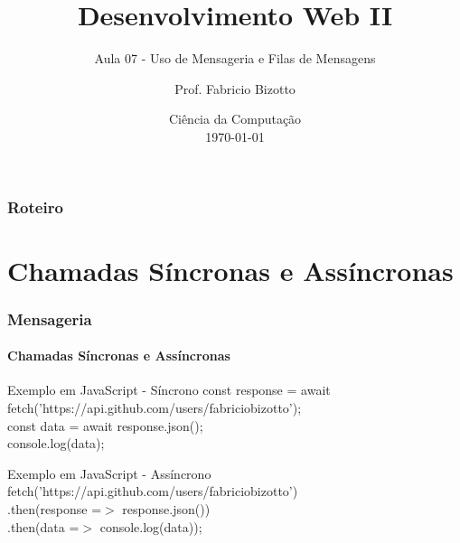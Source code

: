 \documentclass[
	9pt, %
	t, %
]{beamer}
\title[DesWebII]{Desenvolvimento Web II} %
\subtitle{Aula 07 - Uso de Mensageria e Filas de Mensagens} %
\author[Fabricio Bizotto]{Prof. Fabricio Bizotto} %
\institute[IFC]{Instituto Federal Catarinense \\ \smallskip \textit{fabricio.bizotto@ifc.edu.br}} %
\date[\today]{Ciência da Computação \\ \today} %
\begin{document}

\begin{frame}
	\titlepage %
\end{frame}


\begin{frame}
	\frametitle{Roteiro} %
	
	\tableofcontents %
\end{frame}


\section{Chamadas Síncronas e Assíncronas}

\begin{frame}
	\frametitle{Mensageria}
	\framesubtitle{Chamadas Síncronas e Assíncronas}

	\begin{exampleblock}{Exemplo em JavaScript - Síncrono}
		const response = await fetch('https://api.github.com/users/fabriciobizotto');\\
		const data = await response.json();\\
		console.log(data);\\
	\end{exampleblock}

	\begin{exampleblock}{Exemplo em JavaScript - Assíncrono}
		fetch('https://api.github.com/users/fabriciobizotto')\\
			.then(response =$>$ response.json())\\
			.then(data =$>$ console.log(data));\\
	\end{exampleblock}

\end{frame}
\end{document}
